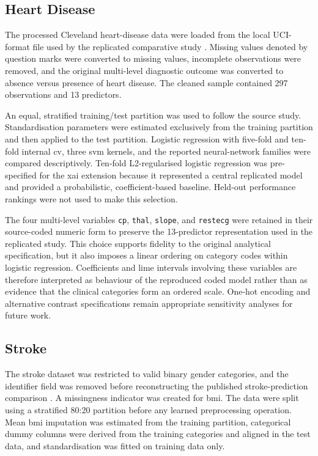 \subsection{Heart Disease}

The processed Cleveland heart-disease data were loaded from the local UCI-format file used by the replicated comparative study \citep{khanna_comparative_2015}. Missing values denoted by question marks were converted to missing values, incomplete observations were removed, and the original multi-level diagnostic outcome was converted to absence versus presence of heart disease. The cleaned sample contained 297 observations and 13 predictors.

An equal, stratified training/test partition was used to follow the source study. Standardisation parameters were estimated exclusively from the training partition and then applied to the test partition. Logistic regression with five-fold and ten-fold internal \gls{cv}, three \gls{svm} kernels, and the reported neural-network families were compared descriptively. Ten-fold L2-regularised logistic regression was pre-specified for the \gls{xai} extension because it represented a central replicated model and provided a probabilistic, coefficient-based baseline. Held-out performance rankings were not used to make this selection.

The four multi-level variables \texttt{cp}, \texttt{thal}, \texttt{slope}, and \texttt{restecg} were retained in their source-coded numeric form to preserve the 13-predictor representation used in the replicated study. This choice supports fidelity to the original analytical specification, but it also imposes a linear ordering on category codes within logistic regression. Coefficients and \gls{lime} intervals involving these variables are therefore interpreted as behaviour of the reproduced coded model rather than as evidence that the clinical categories form an ordered scale. One-hot encoding and alternative contrast specifications remain appropriate sensitivity analyses for future work.

\subsection{Stroke}

The stroke dataset was restricted to valid binary gender categories, and the identifier field was removed before reconstructing the published stroke-prediction comparison \citep{wu_machine_2024}. A missingness indicator was created for \gls{bmi}. The data were split using a stratified 80:20 partition before any learned preprocessing operation. Mean \gls{bmi} imputation was estimated from the training partition, categorical dummy columns were derived from the training categories and aligned in the test data, and standardisation was fitted on training data only.

